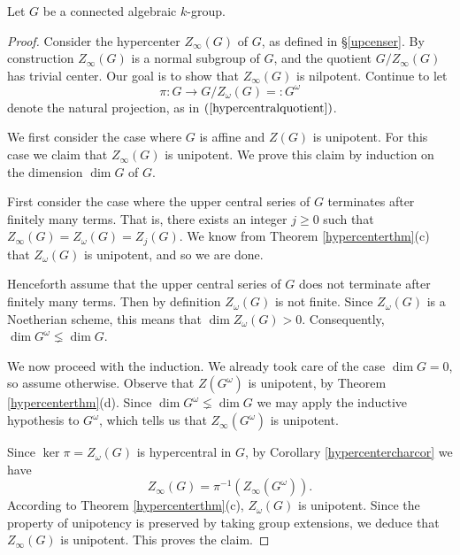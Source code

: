 \documentclass[twoside,a4paper,reqno,11pt]{amsart}
\theoremstyle{definition}
\begin{document}
\vspace{2mm}\noindent Let $G$ be a connected algebraic $k$-group.

\begin{proof} Consider the hypercenter $Z_\infty(G)$ of $G$, as defined in \S \ref{upcenser}. By construction $Z_\infty(G)$ is a normal subgroup of $G$, and the quotient $G/Z_\infty(G)$ has trivial center. Our goal is to show that $Z_\infty(G)$ is nilpotent. Continue to let $$\pi:G\to G/Z_\omega(G)=:G^\omega$$ denote the natural projection, as in $(\ref{hypercentralquotient})$.

\vspace{2mm}\noindent We first consider the case where $G$ is affine and $Z(G)$ is unipotent. For this case we claim that $Z_\infty(G)$ is unipotent. We prove this claim by induction on the dimension $\dim G$ of $G$.

\vspace{2mm}\noindent First consider the case where the upper central series of $G$ terminates after finitely many terms. That is, there exists an integer $j\geq 0$ such that $Z_\infty(G)=Z_\omega(G)=Z_j(G)$. We know from Theorem \ref{hypercenterthm}(c) that $Z_\omega(G)$ is unipotent, and so we are done.

\vspace{2mm}\noindent Henceforth assume that the upper central series of $G$ does not terminate after finitely many terms. Then by definition $Z_\omega(G)$ is not finite. Since $Z_\omega(G)$ is a Noetherian scheme, %
this means that $\dim Z_\omega(G)>0$. %
Consequently, $\dim G^\omega\lneq \dim G$. 

\vspace{2mm}\noindent We now proceed with the induction. We already took care of the case $\dim G=0$, so assume otherwise. Observe that $Z(G^\omega)$ is unipotent, by Theorem \ref{hypercenterthm}(d). Since $\dim G^\omega\lneq \dim G$ we may apply the inductive hypothesis to $G^\omega$, which tells us that $Z_\infty(G^\omega)$ is unipotent.

\vspace{2mm}\noindent Since $\ker\pi=Z_\omega(G)$ is hypercentral in $G$, by Corollary \ref{hypercentercharcor} we have $$Z_\infty(G)=\pi^{-1}(Z_\infty(G^\omega)).$$ %
According to Theorem \ref{hypercenterthm}(c), $Z_\omega(G)$ is unipotent. Since the property of unipotency is preserved by taking group extensions, we deduce that $Z_\infty(G)$ is unipotent. This proves the claim. %


\end{proof}
\end{document}
